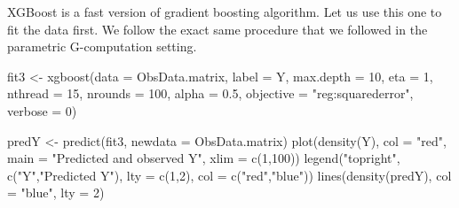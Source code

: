 \documentclass[
]{book}
\newenvironment{Shaded}{\begin{snugshade}}{\end{snugshade}}
\newcommand{\AttributeTok}[1]{\textcolor[rgb]{0.77,0.63,0.00}{#1}}
\newcommand{\DecValTok}[1]{\textcolor[rgb]{0.00,0.00,0.81}{#1}}
\newcommand{\FloatTok}[1]{\textcolor[rgb]{0.00,0.00,0.81}{#1}}
\newcommand{\FunctionTok}[1]{\textcolor[rgb]{0.00,0.00,0.00}{#1}}
\newcommand{\NormalTok}[1]{#1}
\newcommand{\OtherTok}[1]{\textcolor[rgb]{0.56,0.35,0.01}{#1}}
\newcommand{\SpecialCharTok}[1]{\textcolor[rgb]{0.00,0.00,0.00}{#1}}
\newcommand{\StringTok}[1]{\textcolor[rgb]{0.31,0.60,0.02}{#1}}
\begin{document}
XGBoost is a fast version of gradient boosting algorithm. Let us use this one to fit the data first. We follow the exact same procedure that we followed in the parametric G-computation setting.

\begin{Shaded}
\end{Shaded}

\begin{Shaded}
\begin{Highlighting}[]
\NormalTok{fit3 }\OtherTok{\textless{}{-}} \FunctionTok{xgboost}\NormalTok{(}\AttributeTok{data =}\NormalTok{ ObsData.matrix, }
                \AttributeTok{label =}\NormalTok{ Y,}
                \AttributeTok{max.depth =} \DecValTok{10}\NormalTok{, }
                \AttributeTok{eta =} \DecValTok{1}\NormalTok{, }
                \AttributeTok{nthread =} \DecValTok{15}\NormalTok{, }
                \AttributeTok{nrounds =} \DecValTok{100}\NormalTok{, }
                \AttributeTok{alpha =} \FloatTok{0.5}\NormalTok{,}
                \AttributeTok{objective =} \StringTok{"reg:squarederror"}\NormalTok{, }
                \AttributeTok{verbose =} \DecValTok{0}\NormalTok{)}
\end{Highlighting}
\end{Shaded}

\begin{Shaded}
\begin{Highlighting}[]
\NormalTok{predY }\OtherTok{\textless{}{-}} \FunctionTok{predict}\NormalTok{(fit3, }\AttributeTok{newdata =}\NormalTok{ ObsData.matrix)}
\FunctionTok{plot}\NormalTok{(}\FunctionTok{density}\NormalTok{(Y), }
     \AttributeTok{col =} \StringTok{"red"}\NormalTok{, }
     \AttributeTok{main =} \StringTok{"Predicted and observed Y"}\NormalTok{,}
     \AttributeTok{xlim =} \FunctionTok{c}\NormalTok{(}\DecValTok{1}\NormalTok{,}\DecValTok{100}\NormalTok{))  }
\FunctionTok{legend}\NormalTok{(}\StringTok{"topright"}\NormalTok{, }
       \FunctionTok{c}\NormalTok{(}\StringTok{"Y"}\NormalTok{,}\StringTok{"Predicted Y"}\NormalTok{), }
       \AttributeTok{lty =} \FunctionTok{c}\NormalTok{(}\DecValTok{1}\NormalTok{,}\DecValTok{2}\NormalTok{), }
       \AttributeTok{col =} \FunctionTok{c}\NormalTok{(}\StringTok{"red"}\NormalTok{,}\StringTok{"blue"}\NormalTok{))}
\FunctionTok{lines}\NormalTok{(}\FunctionTok{density}\NormalTok{(predY), }\AttributeTok{col =} \StringTok{"blue"}\NormalTok{, }\AttributeTok{lty =} \DecValTok{2}\NormalTok{)}
\end{Highlighting}
\end{Shaded}
\end{document}
